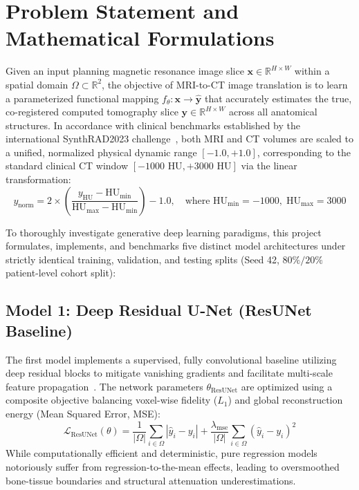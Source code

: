 \section{Problem Statement and Mathematical Formulations}
Given an input planning magnetic resonance image slice $\mathbf{x} \in \mathbb{R}^{H \times W}$ within a spatial domain $\Omega \subset \mathbb{R}^2$, the objective of MRI-to-CT image translation is to learn a parameterized functional mapping $f_\theta: \mathbf{x} \to \mathbf{\hat{y}}$ that accurately estimates the true, co-registered computed tomography slice $\mathbf{y} \in \mathbb{R}^{H \times W}$ across all anatomical structures. In accordance with clinical benchmarks established by the international SynthRAD2023 challenge~\cite{thummerer2023synthrad2023}, both MRI and CT volumes are scaled to a unified, normalized physical dynamic range $[-1.0, +1.0]$, corresponding to the standard clinical CT window $[-1000\text{ HU}, +3000\text{ HU}]$ via the linear transformation:
\begin{equation}
y_{\text{norm}} = 2 \times \left( \frac{y_{\text{HU}} - \text{HU}_{\min}}{\text{HU}_{\max} - \text{HU}_{\min}} \right) - 1.0, \quad \text{where } \text{HU}_{\min} = -1000, \; \text{HU}_{\max} = 3000
\label{eq:hu_normalization}
\end{equation}

To thoroughly investigate generative deep learning paradigms, this project formulates, implements, and benchmarks five distinct model architectures under strictly identical training, validation, and testing splits (Seed 42, $80\%/20\%$ patient-level cohort split):

\subsection{Model 1: Deep Residual U-Net (ResUNet Baseline)}
The first model implements a supervised, fully convolutional baseline utilizing deep residual blocks to mitigate vanishing gradients and facilitate multi-scale feature propagation~\cite{zhang2018road,ronneberger2015u}. The network parameters $\theta_{\text{ResUNet}}$ are optimized using a composite objective balancing voxel-wise fidelity ($L_1$) and global reconstruction energy (Mean Squared Error, MSE):
\begin{equation}
\mathcal{L}_{\text{ResUNet}}(\theta) = \frac{1}{|\Omega|} \sum_{i \in \Omega} |\hat{y}_i - y_i| + \frac{\lambda_{\text{mse}}}{|\Omega|} \sum_{i \in \Omega} (\hat{y}_i - y_i)^2
\label{eq:m1_loss}
\end{equation}
While computationally efficient and deterministic, pure regression models notoriously suffer from regression-to-the-mean effects, leading to oversmoothed bone-tissue boundaries and structural attenuation underestimations.

